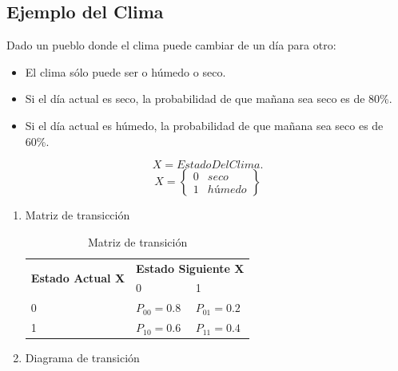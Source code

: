 \documentclass{article}
\begin{document}
\subsection{Ejemplo del Clima}

Dado un pueblo donde el clima puede cambiar de un día para otro: 

\begin{itemize}
    \item El clima sólo puede ser o húmedo o seco.
    \item Si el día actual es seco, la probabilidad de que mañana sea seco es de 80\%.
    \item Si el día actual es húmedo, la probabilidad de que mañana sea seco es de 60\%.
\end{itemize}
$$X = EstadoDelClima.$$
$$
X = 
\begin{Bmatrix}
    0 & seco \\
    1 & húmedo
\end{Bmatrix}
$$

\begin{enumerate}
\item{Matriz de transicción}

\begin{table}[htbp]
\begin{center}
\begin{tabular}{|l|l|l}
\hline
\hline
\multicolumn{1}{|c|}{\multirow{2}{*}{\textbf{Estado Actual X}}} & \multicolumn{2}{c|}{\textbf{Estado Siguiente X}} \\ \cline{2-3} 
\multicolumn{1}{|c|}{}                      & 0                     & 1                     \\ \hline
0                                           & $P_{00}=0.8$          & $P_{01}=0.2$          \\ \hline
1                                           & $P_{10}=0.6$          & $P_{11}=0.4$          \\ \hline

\end{tabular}
\caption{Matriz de transición}
\label{tabla:mtransicion}
\end{center}
\end{table}

\item{Diagrama de transición}\\
\begin{center}
\end{center}
\end{enumerate}
\end{document}

